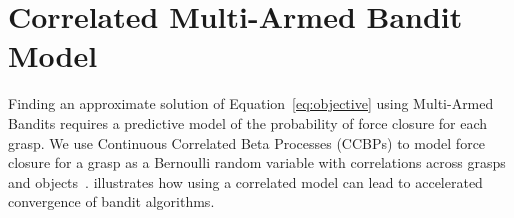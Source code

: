 \section{Correlated Multi-Armed Bandit Model}

Finding an approximate solution of Equation~\ref{eq:objective} using Multi-Armed Bandits requires a predictive model of the probability of force closure for each grasp.
We use Continuous Correlated Beta Processes (CCBPs) to model force closure for a grasp as a Bernoulli random variable with correlations across grasps and objects~\cite{goetschalckx2011continuous, montesano2012active}.
 illustrates how using a correlated model can lead to accelerated convergence of bandit algorithms.

